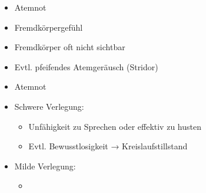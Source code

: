 {
\begin{ABCDESlide}
  \item[\ABCDE{1}]
  \item[\ABCDE{2}]
  \item[\ABCDE{3}]
  \item[\ABCDE{4}] %
  \begin{itemize}
    \item Atemnot
    \item Fremdkörpergefühl
  \end{itemize}
  \item[\ABCDE{A}] %
  \begin{itemize}
    \item Fremdkörper oft nicht sichtbar
    \item Evtl. pfeifendes Atemgeräusch (Stridor)
  \end{itemize}
  \item[\ABCDE{B}] %
  \begin{itemize}
    \item Atemnot
    \item Schwere Verlegung:
    \begin{itemize}
      \item Unfähigkeit zu Sprechen oder effektiv zu husten
      \item Evtl. Bewusstlosigkeit → Kreislaufstillstand
    \end{itemize}
    \item Milde Verlegung:
    \begin{itemize}
      \item {}
    \end{itemize}
  \end{itemize}
  \item[\ABCDE{C}]
  \item[\ABCDE{D}]
  \item[\ABCDE{E}]
  \item[\ABCDE{\ldots}]
  \item[\ABCDE{=}]
\end{ABCDESlide}
}
{}
{}
{}




